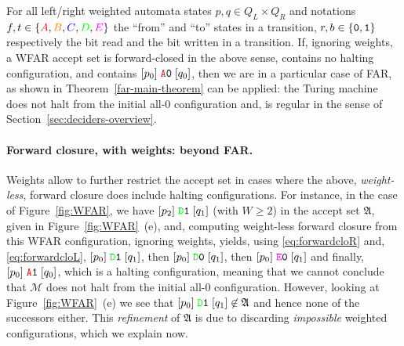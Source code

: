 For all left/right weighted automata states $p,q \in Q_L \times Q_R$ and notations $f,t \in \{\stateA,\stateB,\stateC,\stateD,\stateE\}$ the ``from'' and ``to'' states in a transition, $r,b \in \left\{\texttt{0},\texttt{1}\right\}$ respectively the bit read and the bit written in a transition. If, ignoring weights, a WFAR accept set is forward-closed in the above sense, contains no halting configuration, and contains $[p_0] \; \texttt{\stateA}\szero\; [q_0]$, then we are in a particular case of FAR, as shown in \cite{bbchallenge_part1} \ie Theorem~\ref{far-main-theorem} can be applied: the Turing machine does not halt from the initial all-0 configuration and, is regular in the sense of Section~\ref{sec:deciders-overview}.

\paragraph{Forward closure, with weights: beyond FAR.} Weights allow to further restrict the accept set in cases where the above, \textit{weight-less}, forward closure does include halting configurations. For instance, in the case of Figure~\ref{fig:WFAR}, we have $[p_2] \; \texttt{\stateD}\sone \; [q_1]$ (with $W \geq 2$) in the accept set $\mathfrak{A}$, given in Figure~\ref{fig:WFAR}~(e), and, computing weight-less forward closure from this WFAR configuration, ignoring weights, yields, using \eqref{eq:forwardcloR} and, \eqref{eq:forwardcloL}, $[p_0] \; \texttt{\stateD}\sone \; [q_1]$, then $[p_0] \; \texttt{\stateD}\szero \; [q_1]$, then $[p_0] \; \texttt{\stateE}\szero \; [q_1]$ and finally, $[p_0] \; \texttt{\stateA}\sone \; [q_0] $, which is a halting configuration, meaning that we cannot conclude that $\mathcal{M}$ does not halt from the initial all-0 configuration. However, looking at Figure~\ref{fig:WFAR}~(e) we see that $[p_0] \; \texttt{\stateD}\sone \; [q_1] \not \in \mathfrak{A}$ and hence none of the successors either. This \textit{refinement} of $\mathfrak{A}$ is due to discarding \textit{impossible} weighted configurations, which we explain now.

